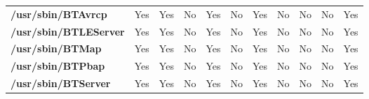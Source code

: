 \begin{center}
{\begin{tabular}{|>{\bfseries} l | C | C | C | C | C | C | C | C | C | C |}
					/usr/sbin/BTAvrcp & Yes & Yes & \color{green}No & \color{red}Yes & \color{green}No & \color{red}Yes & No & No & \color{green}No & \color{red}Yes\\ 
					/usr/sbin/BTLEServer & Yes & Yes & \color{green}No & \color{red}Yes & \color{green}No & \color{red}Yes & No & No & \color{green}No & \color{red}Yes\\ 
					/usr/sbin/BTMap & Yes & Yes & \color{green}No & \color{red}Yes & \color{green}No & \color{red}Yes & No & No & \color{green}No & \color{red}Yes\\ 
					/usr/sbin/BTPbap & Yes & Yes & \color{green}No & \color{red}Yes & \color{green}No & \color{red}Yes & No & No & \color{green}No & \color{red}Yes\\ 
					/usr/sbin/BTServer & Yes & Yes & \color{green}No & \color{red}Yes & \color{green}No & \color{red}Yes & No & No & \color{green}No & \color{red}Yes\\ 

			\end{tabular}
		}
	\end{center}



